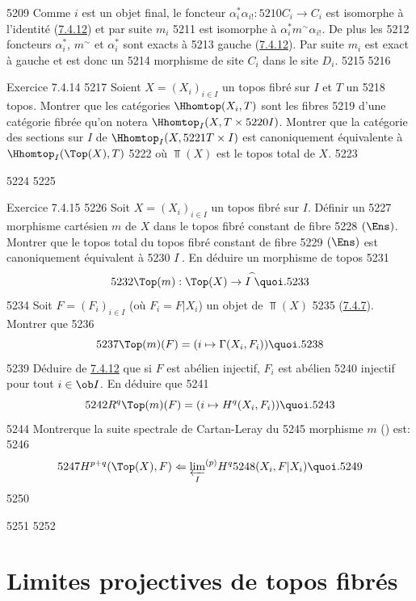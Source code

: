   5209	Comme $i$ est un objet final, le foncteur $\alpha^{\ast}_i \alpha_{i!} :
  5210	C_i \to C_i$ est isomorphe à l'identité (\hyperref[VI.lem7.4.12]{7.4.12}) et par suite $m_i$
  5211	est isomorphe à $\alpha^{\ast}_i m^{\sim} \alpha_{i!}$. De plus les
  5212	foncteurs $\alpha^{\ast}_i$, $m^{\sim}$ et $\alpha^{\ast}_i$ sont exacts à
  5213	gauche (\hyperref[VI.lem7.4.12]{7.4.12}). Par suite $m_i$ est exact à gauche et est donc un
  5214	morphisme de site $C_i$ dans le site $D_i$.
  5215	
  5216	\begin{enonce*}[remark]{Exercice 7.4.14}
  5217	Soient $X = (X_i)_{i \in I}$ un topos fibré sur $I$ et $T$ un
  5218	topos. Montrer que les catégories $\Hhomtop(X_i, T)$ sont les fibres
  5219	d'une catégorie fibrée qu'on notera $\Hhomtop_I(X, T\times
  5220	I)$. Montrer que la catégorie des sections sur $I$ de $\Hhomtop_I(X,
  5221	T\times I)$ est canoniquement équivalente à $\Hhomtop_I(\Top(X), T)$
  5222	où $\Top(X)$ est le topos total de $X$.
  5223	\end{enonce*}
  5224	
  5225	\begin{enonce*}[remark]{Exercice 7.4.15}
  5226	Soit $X = (X_i)_{i \in I}$ un topos fibré sur $I$. Définir un
  5227	morphisme cartésien $m$ de $X$ dans le topos fibré constant de fibre
  5228	$(\Ens)$. Montrer que le topos total du topos fibré constant de fibre
  5229	$(\Ens)$ est canoniquement équivalent à
  5230	$I^{\widehat{\phantom{,}}}$. En déduire un morphisme de topos
  5231	$$
  5232	\Top(m) :\Top(X) \to I^{\widehat{\phantom{,}}}{\quoi}.
  5233	$$
  5234	Soit $F = (F_i)_{i \in I}$ (où $F_i = F | X_i$) un objet de $\Top(X)$
  5235	(\hyperref[VI.prop7.4.7]{7.4.7}). Montrer que
  5236	$$
  5237	\Top(m)(F) = (i \mapsto \Gamma (X_i, F_i)){\quoi}.
  5238	$$
  5239	Déduire de \hyperref[VI.lem7.4.12]{7.4.12} que si $F$ est abélien injectif, $F_i$ est abélien
  5240	injectif pour tout $i \in \ob I$. En déduire que
  5241	$$
  5242	R^q \Top(m)(F) = (i \mapsto H^{q} (X_i, F_i)){\quoi}.
  5243	$$
  5244	Montrer\pageoriginale que la suite spectrale de Cartan-Leray du
  5245	morphisme $m$ () est:
  5246	$$
  5247	H^{p+q} (\Top(X), F) \Leftarrow {\varprojlim_{I}}^{(p)} H^{q}
  5248	(X_i, F|X_i){\quoi}.
  5249	$$
  5250	\end{enonce*}
  5251	
  5252	\section{Limites projectives de topos fibrés}
